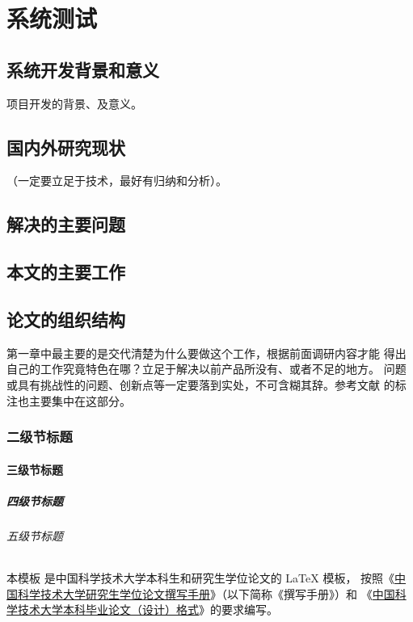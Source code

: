
\chapter{系统测试}

\section{系统开发背景和意义}
项目开发的背景、及意义。
\section{国内外研究现状}
（一定要立足于技术，最好有归纳和分析）。
\section{解决的主要问题}

\section{本文的主要工作}

\section{论文的组织结构}
第一章中最主要的是交代清楚为什么要做这个工作，根据前面调研内容才能
得出自己的工作究竟特色在哪？立足于解决以前产品所没有、或者不足的地方。
问题或具有挑战性的问题、创新点等一定要落到实处，不可含糊其辞。参考文献
的标注也主要集中在这部分。


\subsection{二级节标题}

\subsubsection{三级节标题}

\paragraph{四级节标题}

\subparagraph{五级节标题}

本模板  是中国科学技术大学本科生和研究生学位论文的 \LaTeX{}
模板， 按照《\href{https://gradschool.ustc.edu.cn/static/upload/article/picture/ce3b02e5f0274c90b9331ef50ae1ac26.pdf}
{中国科学技术大学研究生学位论文撰写手册}》（以下简称《撰写手册》）和
《\href{https://www.teach.ustc.edu.cn/?attachment_id=13867}
{中国科学技术大学本科毕业论文（设计）格式}》的要求编写。


